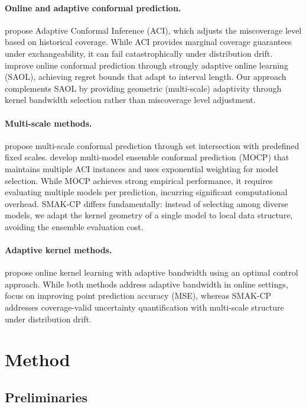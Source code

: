 \documentclass{article}
\theoremstyle{definition}
\begin{document}
\paragraph{Online and adaptive conformal prediction.} \citet{gibbs2021adaptive} propose Adaptive Conformal Inference (ACI), which adjusts the miscoverage level based on historical coverage. While ACI provides marginal coverage guarantees under exchangeability, it can fail catastrophically under distribution drift. \citet{bhatnagar2023improved} improve online conformal prediction through strongly adaptive online learning (SAOL), achieving regret bounds that adapt to interval length. Our approach complements SAOL by providing geometric (multi-scale) adaptivity through kernel bandwidth selection rather than miscoverage level adjustment.

\paragraph{Multi-scale methods.} \citet{baheri2025multiscale} propose multi-scale conformal prediction through set intersection with predefined fixed scales. \citet{hajihashemi2024multi} develop multi-model ensemble conformal prediction (MOCP) that maintains multiple ACI instances and uses exponential weighting for model selection. While MOCP achieves strong empirical performance, it requires evaluating multiple models per prediction, incurring significant computational overhead. SMAK-CP differs fundamentally: instead of selecting among diverse models, we adapt the kernel geometry of a single model to local data structure, avoiding the ensemble evaluation cost.

\paragraph{Adaptive kernel methods.} \citet{zhang2021online} propose online kernel learning with adaptive bandwidth using an optimal control approach. While both methods address adaptive bandwidth in online settings, \citet{zhang2021online} focus on improving point prediction accuracy (MSE), whereas SMAK-CP addresses coverage-valid uncertainty quantification with multi-scale structure under distribution drift.

\section{Method}

\subsection{Preliminaries}
\end{document}
